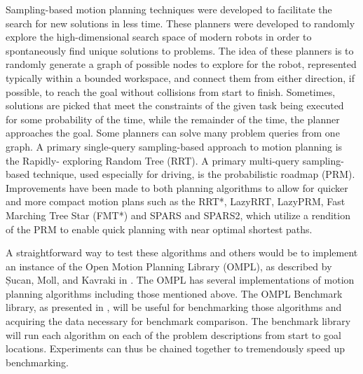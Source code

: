 \documentclass[conference]{IEEEtran} \usepackage[T1]{fontenc} \usepackage[backend=biber, style=ieee]{biblatex}
\begin{document}
Sampling-based motion planning techniques were developed to facilitate the search for new solutions in less time. These planners were developed to randomly explore the
high-dimensional search space of modern robots in order to spontaneously find unique solutions to problems. The idea of these planners is to randomly generate a graph
of possible nodes to explore for the robot, represented typically within a bounded workspace, and connect them from either direction, if possible, to reach the goal 
without collisions from start to finish. Sometimes, solutions are picked that meet the constraints of the given task being executed for some probability of the time, 
while the remainder of the time, the planner approaches the goal. Some planners can solve many problem queries from one graph. A primary single-query sampling-based approach to motion planning is the Rapidly-
exploring Random Tree (RRT). A primary multi-query sampling-based technique, used especially for driving, is the probabilistic roadmap (PRM). Improvements have been
made to both planning algorithms to allow for quicker and more compact motion plans such as the RRT*, LazyRRT, LazyPRM, Fast Marching Tree Star (FMT*) and SPARS
and SPARS2, which utilize a rendition of the PRM to enable quick planning with near optimal shortest paths. 

A straightforward way to test these algorithms and others would be to implement an instance 
of the Open Motion Planning Library (OMPL), as described by Șucan, Moll, and Kavraki in \cite{ompl}. The OMPL has several implementations of motion planning algorithms 
including those mentioned above. The OMPL Benchmark library, as presented in \cite{ompl_benchmark}, will be useful for benchmarking those algorithms and acquiring the
data necessary for benchmark comparison. The benchmark library will run each algorithm on each of the problem descriptions from start to goal locations. 
Experiments can thus be chained together to tremendously speed up benchmarking. 
\end{document}
